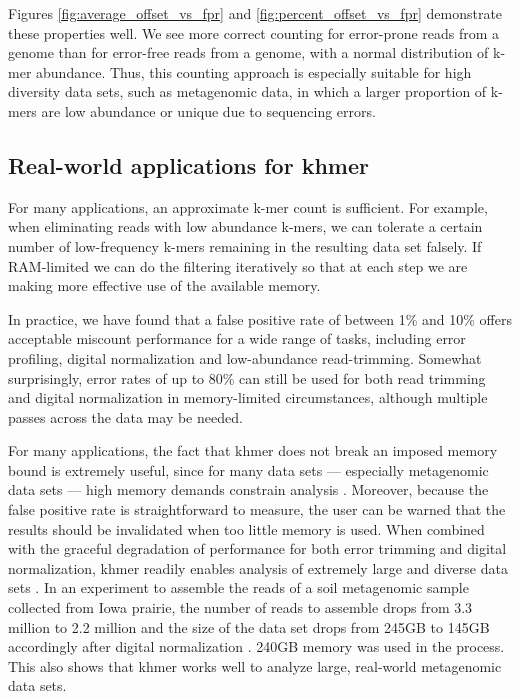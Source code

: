 \documentclass[10pt]{article}
\begin{document}
Figures \ref{fig:average_offset_vs_fpr} and
\ref{fig:percent_offset_vs_fpr} demonstrate these properties well.  We
see more correct counting for error-prone reads from a genome than for
error-free reads from a genome, with a normal distribution of k-mer
abundance.  Thus, this counting approach is especially suitable for
high diversity data sets, such as metagenomic data, in which a larger
proportion of k-mers are low abundance or unique due to sequencing
errors.

\subsection*{Real-world applications for khmer}

For many applications, an approximate k-mer count is sufficient.  For
example, when eliminating reads with low abundance k-mers, we can
tolerate a certain number of low-frequency k-mers remaining in the
resulting data set falsely.  If RAM-limited we can do the filtering
iteratively so that at each step we are making more effective use of
the available memory.

In practice, we have found that a false positive rate of between 1\%
and 10\% offers acceptable miscount performance for a wide range of
tasks, including error profiling, digital normalization and
low-abundance read-trimming.  Somewhat surprisingly, error rates of up
to 80\% can still be used for both read trimming and digital
normalization in memory-limited circumstances, although multiple
passes across the data may be needed.

For many applications, the fact that khmer does not break an imposed
memory bound is extremely useful, since for many data sets ---
especially metagenomic data sets --- high memory demands constrain
analysis \cite{Howe2012,Luo2009}.  Moreover, because the false
positive rate is straightforward to measure, the user can be warned
that the results should be invalidated when too little memory is used.
When combined with the graceful degradation of performance for both
error trimming and digital normalization, khmer readily enables
analysis of extremely large and diverse data sets \cite{adina2013}. In
an experiment to assemble the reads of a soil metagenomic sample
collected from Iowa prairie, the number of reads to assemble drops
from 3.3 million to 2.2 million and the size of the data set drops from
245GB to 145GB accordingly after digital normalization
\cite{Howe2012}.  240GB memory was used in the process. This also
shows that khmer works well to analyze large, real-world metagenomic data
sets.
\end{document}
